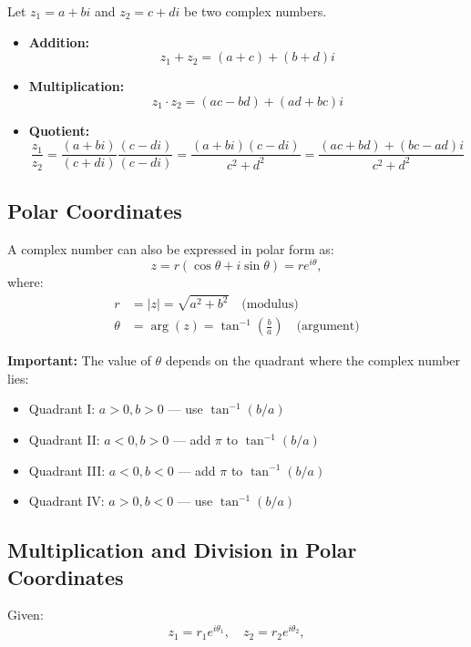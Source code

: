 Let \( z_1 = a + bi \) and \( z_2 = c + di \) be two complex numbers.

\begin{itemize}
	\item \textbf{Addition:}
	      \[
		      z_1 + z_2 = (a + c) + (b + d)i
	      \]

	\item \textbf{Multiplication:}
	      \[
		      z_1 \cdot z_2 = (ac - bd) + (ad + bc)i
	      \]

	\item \textbf{Quotient:}
	      \[
		      \frac{z_1}{z_2} = \frac{(a + bi)}{(c + di)} \frac{(c - di)}{(c - di)} = \frac{(a + bi)(c - di)}{c^2 + d^2} = \frac{(ac + bd) + (bc - ad)i}{c^2 + d^2}
	      \]
\end{itemize}

\subsection{Polar Coordinates}

A complex number can also be expressed in polar form as:
\[
	z = r(\cos \theta + i \sin \theta) = re^{i\theta},
\]
where:
\begin{align*}
	r      & = |z| = \sqrt{a^2 + b^2} \quad \text{(modulus)}                       \\
	\theta & = \arg(z) = \tan^{-1}\left(\frac{b}{a}\right) \quad \text{(argument)}
\end{align*}

\textbf{Important:} The value of \( \theta \) depends on the quadrant where the complex number lies:
\begin{itemize}
	\item Quadrant I: \( a > 0, b > 0 \) — use \( \tan^{-1}(b/a) \)
	\item Quadrant II: \( a < 0, b > 0 \) — add \( \pi \) to \( \tan^{-1}(b/a) \)
	\item Quadrant III: \( a < 0, b < 0 \) — add \( \pi \) to \( \tan^{-1}(b/a) \)
	\item Quadrant IV: \( a > 0, b < 0 \) — use \( \tan^{-1}(b/a) \)
\end{itemize}

\subsection{Multiplication and Division in Polar Coordinates}

Given:
\[
	z_1 = r_1 e^{i\theta_1}, \quad z_2 = r_2 e^{i\theta_2},
\]


